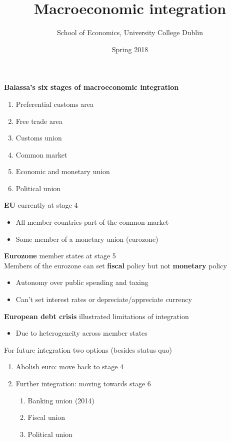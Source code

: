\documentclass{beamer}
\title{Macroeconomic integration}
\author{School of Economics, University College Dublin}
\date{Spring 2018}
\begin{document}
\begin{frame}
 \titlepage
\end{frame}

\begin{frame}
  \textbf{Balassa's six stages of macroeconomic integration}
  \begin{enumerate}
    \item Preferential customs area
    \item Free trade area
    \item Customs union
    \item Common market
    \item Economic and monetary union
    \item Political union
  \end{enumerate}
\end{frame}

\begin{frame}
  \textbf{EU} currently at stage 4
  \begin{itemize}
    \item All member countries part of the common market
    \item Some member of a monetary union (eurozone)
  \end{itemize}
  \medskip
 \textbf{Eurozone} member states at stage 5\\
  \medskip
  Members of the eurozone can set \textbf{fiscal} policy but not \textbf{monetary} policy
  \begin{itemize}
    \item Autonomy over public spending and taxing
    \item Can't set interest rates or depreciate/appreciate currency
  \end{itemize}
\end{frame}

\begin{frame}
  \textbf{European debt crisis} illustrated limitations of integration
  \begin{itemize}
    \item Due to heterogeneity across member states
  \end{itemize}
  \medskip
  For future integration two options (besides status quo)
  \begin{enumerate}
    \item Abolish euro: move back to stage 4
    \item Further integration: moving towards stage 6
    \begin{enumerate}[i]
      \item Banking union (2014)
      \item Fiscal union
      \item Political union
    \end{enumerate}    
  \end{enumerate}  
\end{frame}
\end{document}
